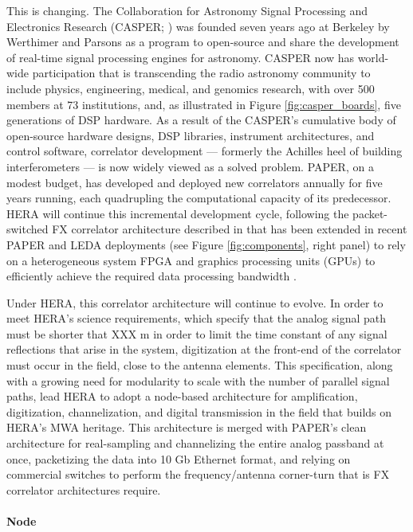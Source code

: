 \documentclass[preprint]{aastex}
\begin{document}
This is changing.  The Collaboration for Astronomy Signal Processing and Electronics Research
(CASPER; \citealt{parsons_et_al2006}) was founded seven years ago at Berkeley
by Werthimer and Parsons as a program 
to open-source and share the development of real-time signal processing engines for astronomy.
CASPER now has world-wide participation that is
transcending the radio astronomy community to include physics, engineering,
medical, and genomics research, with
over 500 members at 73 institutions, and, as illustrated in
Figure \ref{fig:casper_boards}, five generations of DSP hardware.
As a result of the CASPER's cumulative body of open-source hardware designs, DSP libraries, instrument
architectures, and control software,
correlator development --- formerly the Achilles heel of building interferometers ---
is now widely viewed as a solved problem.  PAPER, on a modest budget, has developed and deployed new correlators
annually for five years running, each quadrupling the computational capacity of its predecessor.
HERA will continue this incremental development cycle, following the packet-switched
FX correlator architecture described in \citet{parsons_et_al2008} that has been
extended in recent PAPER and LEDA deployments (see Figure \ref{fig:components}, right panel)
to rely on a heterogeneous system FPGA and graphics processing units (GPUs)
to efficiently achieve the required data processing bandwidth \citep{clark_et_al2011}.

Under HERA, this correlator architecture will continue to evolve.  In order to meet HERA's science requirements,
which specify that the analog signal path must be shorter that XXX m in order to limit the time constant of any signal reflections
that arise in the system, digitization at the front-end of the correlator must occur in the field, close to the antenna
elements.  This specification, along with a growing need for modularity to scale with the number of parallel signal paths,
lead HERA to adopt a node-based architecture for amplification, digitization, channelization, and digital
transmission in the field that builds on HERA's MWA heritage.  This architecture is merged with PAPER's clean 
architecture for real-sampling and channelizing the entire analog passband at once, packetizing the data into
10 Gb Ethernet format, and relying on commercial switches to perform the frequency/antenna corner-turn that is
FX correlator architectures require. 

\paragraph{Node}
\end{document}
